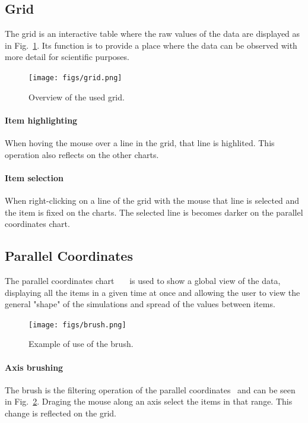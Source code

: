 \documentclass[10pt, conference]{IEEEtran}
\begin{document}
\subsection{Grid}

The grid is an interactive table where the raw values of the data are displayed as in Fig.~\ref{fig:grid}. Its function is to provide a place where the data can be observed with more detail for scientific purposes.

\begin{figure}
\texttt{[image: figs/grid.png]}
\caption{Overview of the used grid.} 
\label{fig:grid}
\end{figure}
\paragraph*{Item highlighting} When hoving the mouse over a line in the grid, that line is highlited. This operation also reflects on the other charts.
\paragraph*{Item selection} When right-clicking on a line of the grid with the mouse that line is selected and the item is fixed on the charts. The selected line is becomes darker on the parallel coordinates chart.

\subsection{Parallel Coordinates}

The parallel coordinates chart~\cite{fanea2005interactive}~\cite{inselberg1990parallel}~\cite{inselberg1985plane} is used to show a global view of the data, displaying all the items in a given time at once and allowing the user to view the general "shape" of the simulations and spread of the values between items.

\begin{figure}
\texttt{[image: figs/brush.png]}
\caption{Example of use of the brush.} 
\label{fig:brush}
\end{figure}
\paragraph*{Axis brushing} The brush is the filtering operation of the parallel coordinates~\cite{siirtola2006interacting} and can be seen in Fig.~\ref{fig:brush}. Draging the mouse along an axis select the items in that range. This change is reflected on the grid.
\end{document}
